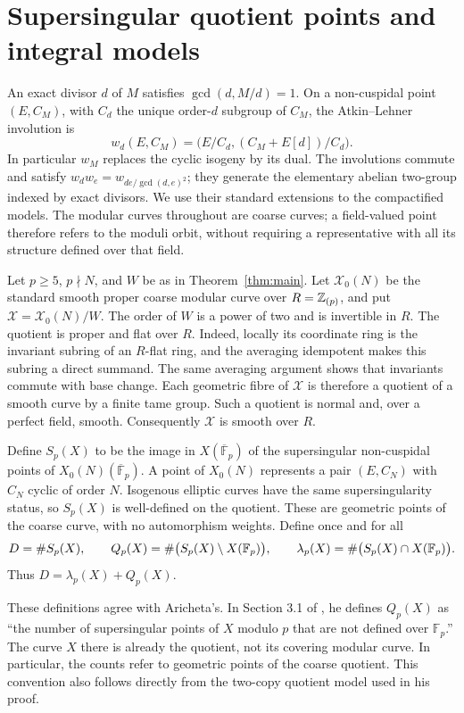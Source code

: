 \documentclass[11pt,a4paper]{article}
\theoremstyle{remark}\newtheorem{remark}[theorem]{Remark}
\numberwithin{equation}{section}
\newcommand{\kk}{\overline{\mathbb F}_p}
\begin{document}
\section{Supersingular quotient points and integral models}\label{sec:prelim}
An exact divisor $d$ of $M$ satisfies $\gcd(d,M/d)=1$. On a non-cuspidal point $(E,C_M)$, with $C_d$ the unique order-$d$ subgroup of $C_M$, the Atkin--Lehner involution is
\[
w_d(E,C_M)=\bigl(E/C_d,(C_M+E[d])/C_d\bigr).
\]
In particular $w_M$ replaces the cyclic isogeny by its dual. The involutions commute and satisfy $w_dw_e=w_{de/\gcd(d,e)^2}$; they generate the elementary abelian two-group indexed by exact divisors. We use their standard extensions to the compactified models. The modular curves throughout are coarse curves; a field-valued point therefore refers to the moduli orbit, without requiring a representative with all its structure defined over that field.

Let $p\geq5$, $p\nmid N$, and $W$ be as in Theorem~\ref{thm:main}. Let $\mathscr X_0(N)$ be the standard smooth proper coarse modular curve over $R=\mathbb Z_{(p)}$, and put $\mathscr X=\mathscr X_0(N)/W$. The order of $W$ is a power of two and is invertible in $R$. The quotient is proper and flat over $R$. Indeed, locally its coordinate ring is the invariant subring of an $R$-flat ring, and the averaging idempotent makes this subring a direct summand. The same averaging argument shows that invariants commute with base change. Each geometric fibre of $\mathscr X$ is therefore a quotient of a smooth curve by a finite tame group. Such a quotient is normal and, over a perfect field, smooth. Consequently $\mathscr X$ is smooth over $R$.

Define $S_p(X)$ to be the image in $X(\kk)$ of the supersingular non-cuspidal points of $X_0(N)(\kk)$. A point of $X_0(N)$ represents a pair $(E,C_N)$ with $C_N$ cyclic of order $N$. Isogenous elliptic curves have the same supersingularity status, so $S_p(X)$ is well-defined on the quotient. These are geometric points of the coarse curve, with no automorphism weights. Define once and for all
\begin{equation}\label{eq:counts}
D=\#S_p(X),\qquad
Q_p(X)=\#\bigl(S_p(X)\setminus X(\mathbb F_p)\bigr),\qquad
\lambda_p(X)=\#\bigl(S_p(X)\cap X(\mathbb F_p)\bigr).
\end{equation}
Thus $D=\lambda_p(X)+Q_p(X)$.

These definitions agree with Aricheta's. In Section 3.1 of \cite{Aricheta}, he defines $Q_p(X)$ as ``the number of supersingular points of $X$ modulo $p$ that are not defined over $\mathbb F_p$.'' The curve $X$ there is already the quotient, not its covering modular curve. In particular, the counts refer to geometric points of the coarse quotient. This convention also follows directly from the two-copy quotient model used in his proof.
\end{document}
